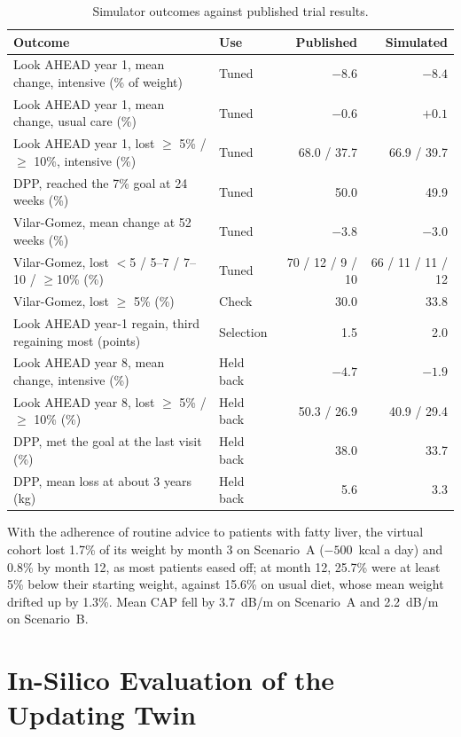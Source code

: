 \begin{table}[htbp]
\centering
\caption{Simulator outcomes against published trial results.}
\label{tab:r_calibration}
\begin{tabular}{p{7.6cm}p{1.6cm}rr}
\toprule
Outcome & Use & Published & Simulated \\
\midrule
Look AHEAD year 1, mean change, intensive (\% of weight) & Tuned & $-8.6$ & $-8.4$ \\
Look AHEAD year 1, mean change, usual care (\%) & Tuned & $-0.6$ & $+0.1$ \\
Look AHEAD year 1, lost $\geq$ 5\% / $\geq$ 10\%, intensive (\%) & Tuned & 68.0 / 37.7 & 66.9 / 39.7 \\
DPP, reached the 7\% goal at 24 weeks (\%) & Tuned & 50.0 & 49.9 \\
Vilar-Gomez, mean change at 52 weeks (\%) & Tuned & $-3.8$ & $-3.0$ \\
Vilar-Gomez, lost $<$5 / 5--7 / 7--10 / $\geq$10\% (\%) & Tuned & 70 / 12 / 9 / 10 & 66 / 11 / 11 / 12 \\
Vilar-Gomez, lost $\geq$ 5\% (\%) & Check & 30.0 & 33.8 \\
Look AHEAD year-1 regain, third regaining most (points) & Selection & 1.5 & 2.0 \\
\midrule
Look AHEAD year 8, mean change, intensive (\%) & Held back & $-4.7$ & $-1.9$ \\
Look AHEAD year 8, lost $\geq$ 5\% / $\geq$ 10\% (\%) & Held back & 50.3 / 26.9 & 40.9 / 29.4 \\
DPP, met the goal at the last visit (\%) & Held back & 38.0 & 33.7 \\
DPP, mean loss at about 3 years (kg) & Held back & 5.6 & 3.3 \\
\bottomrule
\end{tabular}
\end{table}

With the adherence of routine advice to patients with fatty liver, the virtual
cohort lost 1.7\% of its weight by month 3 on Scenario~A ($-500$~kcal a day)
and 0.8\% by month 12, as most patients eased off; at month 12, 25.7\% were at
least 5\% below their starting weight, against 15.6\% on usual diet, whose mean
weight drifted up by 1.3\%. Mean CAP fell by 3.7~dB/m on Scenario~A and 2.2~dB/m on Scenario~B.

\section{In-Silico Evaluation of the Updating Twin}
\label{sec:r_insilico}

